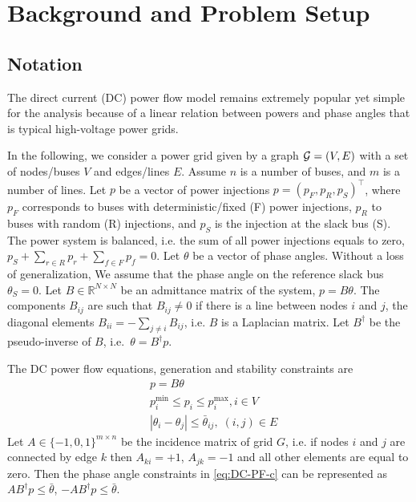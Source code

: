 \documentclass{IEEEtran4PSCC}
\newcommand{\cG}{{\cal G}}
\begin{document}
\section{Background and Problem Setup}\label{sec:not}

\subsection{Notation}
The direct current (DC) power flow model remains extremely popular yet simple for the analysis because of a linear relation between powers and phase angles that is typical high-voltage power grids. 

In the following, we consider a power grid given by a graph $\cG = (V, E)$ with a set of nodes/buses $V$ and edges/lines $E$. Assume $n$ is a number of buses, and $m$ is a number of lines. Let $p$ be a vector of power injections $p = (p_F, p_R, p_S)^\top$, where $p_F$ corresponds to buses with deterministic/fixed (F) power injections, $p_R$ to buses with random (R) injections, and $p_S$ is the injection at the slack bus (S). The power system is balanced, i.e. the sum of all power injections equals to zero, $p_S + \sum_{r\in R} p_r + \sum_{f\in F} p_f = 0$. Let $\theta$ be a vector of phase angles. Without a loss of generalization, We assume that the phase angle on the reference slack bus $\theta_S = 0$. Let $B \in \mathbb{R}^{N \times N}$ be an admittance matrix of the system, $p = B\theta$. The components $B_{ij}$ are such that $B_{ij} \neq 0$ if there is a line between nodes $i$ and $j$, the diagonal elements $B_{ii} = - \sum_{j\neq i} B_{ij}$, i.e. $B$ is a Laplacian matrix. Let $B^{\dagger}$ be the pseudo-inverse of $B$, i.e.~$\theta = B^{\dagger} p$. 

The DC power flow equations, generation and stability constraints are
\begin{align}
    & p = B \theta \label{eq:DC-PF-a}\\
    & p^{\min}_i \leq p_i \leq p^{\max}_i, i \in V \label{eq:DC-PF-b}\\
    & |\theta_i - \theta_j| \leq \bar{\theta}_{ij}, \; (i,j)\in E \label{eq:DC-PF-c}
\end{align}
Let $A \in \{-1,0,1 \}^{m \times n}$ be the incidence matrix of grid $G$, i.e. if nodes $i$ and $j$ are connected by edge $k$ then $A_{ki} = +1$, $A_{jk} = -1$ and all other elements are equal to zero. Then the phase angle constraints in \eqref{eq:DC-PF-c} can be represented as  $AB^{\dagger}p \le \bar\theta$, $-AB^{\dagger}p \le \bar\theta$. 
\end{document}
